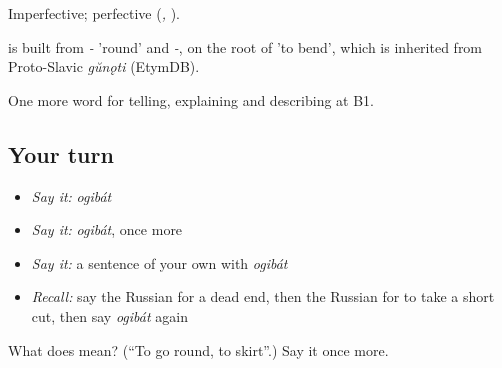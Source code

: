 Imperfective; perfective \emph{} (\emph{, }).

\begin{cousinweb}
\emph{} is built from \emph{-} 'round' and \emph{-}, on the root of \emph{} 'to bend', which is inherited from Proto-Slavic \emph{gŭnǫti} (EtymDB).
\end{cousinweb}

\begin{grammarlens}[title={What you've built}]
One more word for telling, explaining and describing at B1.
\end{grammarlens}

\subsection*{Your turn}
\begin{itemize}
\raggedright
  \item \emph{Say it:} \emph{ogibát}
  \item \emph{Say it:} \emph{ogibát}, once more
  \item \emph{Say it:} a sentence of your own with \emph{ogibát}
  \item \emph{Recall:} say the Russian for a dead end, then the Russian for to take a short cut, then say \emph{ogibát} again
\end{itemize}

\begin{tcolorbox}[breakable,colback=teal!4,colframe=teal!35!black,title={Before you move on}]
What does  mean? (\textquotedblleft{}To go round, to skirt\textquotedblright{}.) Say it once more.
\end{tcolorbox}
